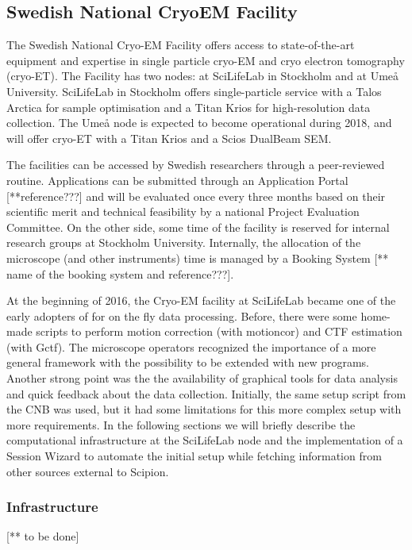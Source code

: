 
\subsection{Swedish National CryoEM Facility}

The Swedish National Cryo-EM Facility offers access to state-of-the-art equipment and expertise 
in single particle cryo-EM and cryo electron tomography (cryo-ET). The Facility has two nodes: at SciLifeLab 
in Stockholm and at Umeå University. SciLifeLab in Stockholm offers single-particle service with a 
Talos Arctica for sample optimisation and a Titan Krios for high-resolution data collection. 
The Umeå node is expected to become operational during 2018, and will offer cryo-ET with a 
Titan Krios and a Scios DualBeam SEM.

The facilities can be accessed by Swedish researchers through a peer-reviewed routine. Applications can be 
submitted through an Application Portal [**reference???] and will be evaluated once every three months based on their 
scientific merit and technical feasibility by a national Project Evaluation Committee. On the other side, 
some time of the facility is reserved for internal research groups at Stockholm University. Internally, the allocation
of the microscope (and other instruments) time is managed by a Booking System [** name of the booking system and reference???]. 


At the beginning of 2016, the Cryo-EM facility at SciLifeLab became one of the early adopters of \scipion 
for on the fly data processing. Before, there were some home-made scripts to perform motion correction (with motioncor)
and CTF estimation (with Gctf). The microscope operators recognized the importance of  
a more general framework with the possibility to be extended with new programs. Another strong point was the 
the availability of graphical tools for data analysis and quick feedback about the data collection. Initially, the 
same setup script from the CNB was used, but it had some limitations for this more complex setup with more 
requirements. In the following sections we will briefly describe the computational infrastructure at the
SciLifeLab node and the implementation of a Session Wizard to automate the initial setup while fetching 
information from other sources external to Scipion. 


\subsubsection{Infrastructure}
[** to be done]

